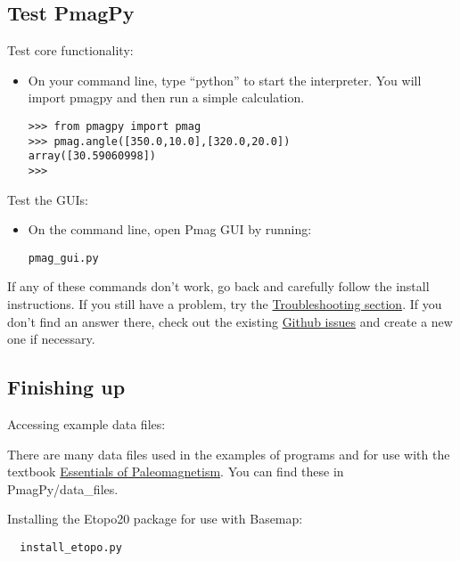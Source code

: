 \documentclass[11pt]{article}
\begin{document}
\subsection{Test PmagPy}


Test core functionality:

\begin{itemize}
  \item On your command line, type ``python'' to start the interpreter.  You will import pmagpy and then run a simple calculation.

\begin{verbatim}
>>> from pmagpy import pmag
>>> pmag.angle([350.0,10.0],[320.0,20.0])
array([30.59060998])
>>>
\end{verbatim}

\end{itemize}

Test the GUIs:

\begin{itemize}
\item  On the command line, open Pmag GUI by running:

\begin{verbatim}
pmag_gui.py
\end{verbatim}

\end{itemize}

If any of these commands don't work, go back and carefully follow the install instructions.  If you still have a problem, try the \href{https://earthref.org/PmagPy/cookbook/#trouble}{Troubleshooting section}.  If you don't find an answer there, check out the existing \href{https://github.com/PmagPy/PmagPy/issues}{Github issues} and create a new one if necessary.

\subsection{Finishing up}

Accessing example data files:

   There are many data files used in the examples of programs and for use with the textbook  \href{http://earthref.org/MAGIC/books/Tauxe/Essentials/WebBook3.html}{Essentials of Paleomagnetism}.  You can find these in PmagPy/data_files.


Installing the Etopo20 package for use with Basemap:

\begin{verbatim}
  install_etopo.py
\end{verbatim}
\end{document}
